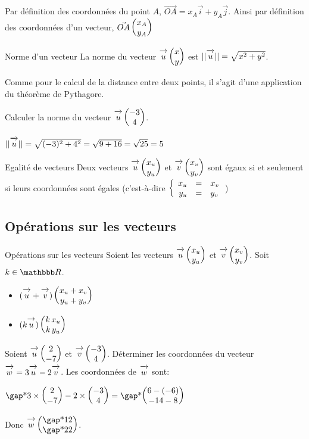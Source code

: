 \documentclass[10pt,a4paper,openany,twoside, prof]{book}
\begin{document}
\begin{dem}{}{}
	Par définition des coordonnées du point $A$, $\vec{OA} = x_A\vec{i}+y_A\vec{j}$. Ainsi par définition des coordonnées d'un vecteur, $\vec{OA}\begin{pmatrix}x_A\\y_A\end{pmatrix}$
\end{dem}


\begin{prop}{Norme d'un vecteur}{}
	La norme du vecteur $\overrightarrow{\,\mathstrut u\,} \begin{pmatrix}x\\y\end{pmatrix}$ est $||\overrightarrow{\,\mathstrut u\,}|| = \sqrt{x^2+y^2}$.
\end{prop}

\begin{dem}{}{}
	Comme pour le calcul de la distance entre deux points, il s'agit d'une application du théorème de Pythagore.
\end{dem}

\begin{ex}{}{}
	Calculer la norme du vecteur $\overrightarrow{\,\mathstrut u\,} \begin{pmatrix}-3\\4\end{pmatrix}$.
	\begin{reponse}
	$||\overrightarrow{\,\mathstrut u\,}||=\sqrt{(-3)^2+4^2}=\sqrt{9+16}=\sqrt{25}=5$
	\end{reponse}
\end{ex}

\begin{prop}{Egalité de vecteurs}{}
	Deux vecteurs $\overrightarrow{\,\mathstrut u\,}\begin{pmatrix}x_u\\y_u\end{pmatrix}$ et $\overrightarrow{\,\mathstrut v\,}\begin{pmatrix}x_v\\y_v\end{pmatrix}$ sont égaux si et seulement si leurs coordonnées sont égales (c'est-à-dire $\left\{\begin{array}{rcl} x_u&=&x_v\\y_u&=&y_v \end{array}\right.$)
\end{prop}


\subsection{Opérations sur les vecteurs}

\begin{prop}{Opérations sur les vecteurs}{}
	Soient les vecteurs $\overrightarrow{\,\mathstrut u\,} \begin{pmatrix}x_u\\y_u\end{pmatrix}$ et $\overrightarrow{\,\mathstrut v\,} \begin{pmatrix}x_v\\y_v\end{pmatrix}$. Soit $k\in\R$.

	\begin{itemize}
		\item $(\overrightarrow{\,\mathstrut u\,}+\overrightarrow{\,\mathstrut v\,}) \begin{pmatrix}x_u+x_v\\y_u+y_v\end{pmatrix}$
		\item $(k\overrightarrow{\,\mathstrut u\,}) \begin{pmatrix}k\, x_u\\k\, y_u\end{pmatrix}$
	\end{itemize}
\end{prop}

\begin{ex}{}{}
	Soient $\overrightarrow{\,\mathstrut u\,} \begin{pmatrix}2\\-7\end{pmatrix}$ et $\overrightarrow{\,\mathstrut v\,} \begin{pmatrix}-3\\4\end{pmatrix}$. Déterminer les coordonnées du vecteur $\overrightarrow{\,\mathstrut w\,} = 3\overrightarrow{\,\mathstrut u\,}-2\overrightarrow{\,\mathstrut v\,}$.
	Les coordonnées de $\overrightarrow{\,\mathstrut w\,}$ sont:

	$\troum{3\times\coordvp{2}{-7} -2\times\coordvp{-3}{4}} = \troum{\coordvp{6-(-6)}{-14-8}}$

	Donc $\vecw\coordvp{\troum{12}}{\troum{22}}$.
\end{ex}
\end{document}
